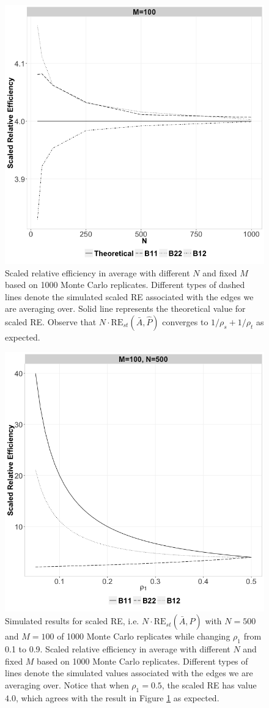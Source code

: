 \documentclass[a4paper]{article}
\begin{document}
\begin{figure}[!htb]
	\centering
	\includegraphics[width=.8\textwidth]{RE.png}
	\caption{Scaled relative efficiency in average with different $N$ and fixed $M$ based on 1000 Monte Carlo replicates. Different types of dashed lines denote the simulated scaled RE associated with the edges we are averaging over. Solid line represents the theoretical value for scaled RE. Observe that $N \cdot \mathrm{RE}_{st}(\bar{A}, \hat{P})$ converges to $1/\rho_s + 1/\rho_t$ as expected.}
	\label{fig:RE}
\end{figure}

\begin{figure}[!htb]
\centering
\includegraphics[width=.8\textwidth]{Rho.png}
\caption{Simulated results for scaled RE, i.e. $N \cdot \mathrm{RE}_{st}(\bar{A}, \hat{P})$ with $N = 500$ and $M = 100$ of 1000 Monte Carlo replicates while changing $\rho_1$ from 0.1 to 0.9. Scaled relative efficiency in average with different $N$ and fixed $M$ based on 1000 Monte Carlo replicates. Different types of lines denote the simulated values associated with the edges we are averaging over. Notice that when $\rho_1 = 0.5$, the scaled RE has value $4.0$, which agrees with the result in Figure \ref{fig:RE} as expected.}
\label{fig:RErho}
\end{figure}
\end{document}

